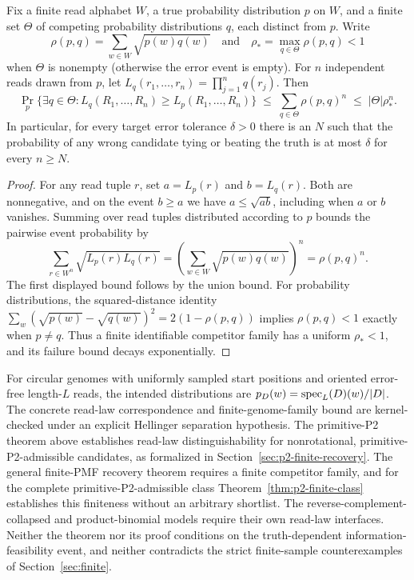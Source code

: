 \begin{theorem}
\label{thm:finite-recovery}
Fix a finite read alphabet $W$, a true probability distribution $p$ on $W$,
and a finite set $\Theta$ of competing probability distributions $q$,
each distinct from $p$.  Write
\[
  \rho(p,q)=\sum_{w\in W}\sqrt{p(w)q(w)}
  \quad\text{and}\quad
  \rho_*=\max_{q\in\Theta}\rho(p,q)<1
\]
when $\Theta$ is nonempty (otherwise the error event is empty).  For $n$
independent reads drawn from $p$, let
$L_q(r_1,\ldots,r_n)=\prod_{j=1}^{n}q(r_j)$.
Then
\[
  \Pr_p\!\bigl\{\exists q\in\Theta:
       L_q(R_1,\ldots,R_n)\ge L_p(R_1,\ldots,R_n)\bigr\}
  \;\le\; \sum_{q\in\Theta}\rho(p,q)^n
  \;\le\;|\Theta|\rho_*^n.
\]
In particular, for every target error tolerance $\delta>0$ there is an $N$
such that the probability of any wrong candidate tying or beating the
truth is at most $\delta$ for every $n\ge N$.
\end{theorem}

\begin{proof}
For any read tuple $r$, set $a=L_p(r)$ and $b=L_q(r)$.  Both are
nonnegative, and on the event $b\ge a$ we have
$a\le\sqrt{ab}$, including when $a$ or $b$ vanishes.
Summing over read tuples distributed according to $p$ bounds the
pairwise event probability by
\[
 \sum_{r\in W^n}\sqrt{L_p(r)L_q(r)}
 =\left(\sum_{w\in W}\sqrt{p(w)q(w)}\right)^n
 =\rho(p,q)^n.
\]
The first displayed bound follows by the union bound.  For probability
distributions, the squared-distance identity
$\sum_w(\sqrt{p(w)}-\sqrt{q(w)})^2=2(1-\rho(p,q))$
implies $\rho(p,q)<1$ exactly when $p\ne q$.
Thus a finite identifiable competitor family has a uniform
$\rho_*<1$, and its failure bound decays exponentially.
\end{proof}



For circular genomes with uniformly sampled start positions and oriented
error-free length-$L$ reads, the intended distributions are
$p_D(w)=\operatorname{spec}_L(D)(w)/|D|$. The concrete read-law correspondence and
finite-genome-family bound are kernel-checked under an explicit
Hellinger separation hypothesis. The primitive-P2 theorem above
establishes read-law distinguishability for nonrotational,
primitive-P2-admissible candidates, as formalized in
Section~\ref{sec:p2-finite-recovery}. The general finite-PMF recovery
theorem requires a finite competitor family, and for the complete
primitive-P2-admissible class Theorem~\ref{thm:p2-finite-class}
establishes this finiteness without an arbitrary shortlist.  The reverse-complement-collapsed and product-binomial models require their own read-law
interfaces.  Neither the theorem nor its proof conditions on the
truth-dependent information-feasibility event, and neither contradicts the
strict finite-sample counterexamples of Section~\ref{sec:finite}.


